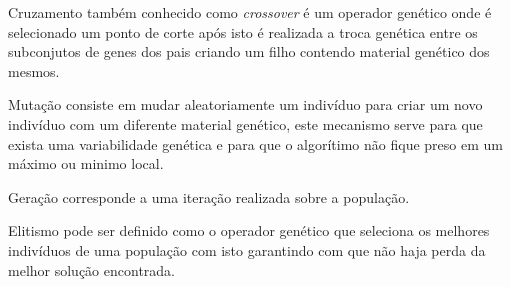 Cruzamento também conhecido como \textit{crossover} é um operador genético onde é selecionado um ponto de corte após isto é realizada a troca genética entre os subconjutos de genes dos pais criando um filho contendo material genético dos mesmos.

Mutação consiste em mudar aleatoriamente um indivíduo para criar um novo indivíduo com um diferente material genético, este mecanismo serve para que exista uma variabilidade genética e para que o algorítimo não fique preso em um máximo ou minimo local.

Geração corresponde a uma iteração realizada sobre a população.

Elitismo pode ser definido como o operador genético que seleciona os melhores indivíduos de uma população com isto garantindo com que não haja perda da melhor solução encontrada.


